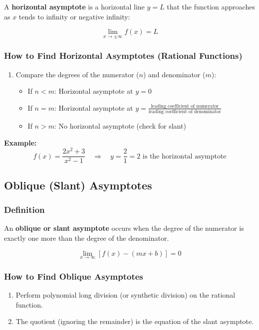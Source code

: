 A \textbf{horizontal asymptote} is a horizontal line \(y = L\) that the function approaches as \(x\) tends to infinity or negative infinity:

\[
\lim_{x \to \pm\infty} f(x) = L
\]

\subsubsection*{How to Find Horizontal Asymptotes (Rational Functions)}

\begin{enumerate}
    \item Compare the degrees of the numerator (\(n\)) and denominator (\(m\)):
    \begin{itemize}
        \item If \(n < m\): Horizontal asymptote at \(y = 0\)
        \item If \(n = m\): Horizontal asymptote at \(y = \frac{\text{leading coefficient of numerator}}{\text{leading coefficient of denominator}}\)
        \item If \(n > m\): No horizontal asymptote (check for slant)
    \end{itemize}
\end{enumerate}

\textbf{Example:}
\[
f(x) = \frac{2x^2 + 3}{x^2 - 1} \quad \Rightarrow \quad y = \frac{2}{1} = 2 \text{ is the horizontal asymptote}
\]

\subsection{Oblique (Slant) Asymptotes}

\subsubsection*{Definition}

An \textbf{oblique or slant asymptote} occurs when the degree of the numerator is exactly one more than the degree of the denominator.

\[
\lim_{x \to \infty} [f(x) - (mx + b)] = 0
\]

\subsubsection*{How to Find Oblique Asymptotes}

\begin{enumerate}
    \item Perform polynomial long division (or synthetic division) on the rational function.
    \item The quotient (ignoring the remainder) is the equation of the slant asymptote.
\end{enumerate}


